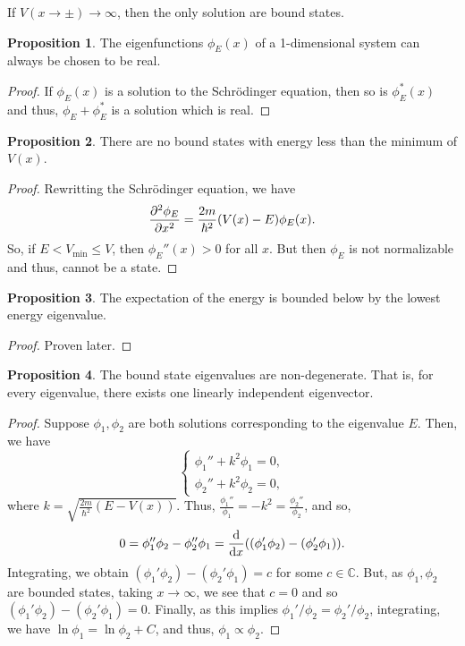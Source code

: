 \documentclass[]{article}
\theoremstyle{definition}
\theoremstyle{definition}
\newtheorem{proposition}{Proposition}[section]
\begin{document}
If \(V(x \to \pm) \to \infty\), then the only solution are bound states.

\begin{proposition}
  The eigenfunctions \(\phi_E(x)\) of a 1-dimensional system can always be 
  chosen to be real.
\end{proposition}
\begin{proof}
  If \(\phi_E(x)\) is a solution to the Schrödinger equation, then so is 
  \(\phi_E^*(x)\) and thus, \(\phi_E + \phi_E^*\) is a solution which is 
  real.
\end{proof}

\begin{proposition}
  There are no bound states with energy less than the minimum of \(V(x)\).
\end{proposition}
\begin{proof}
  Rewritting the Schrödinger equation, we have 
  \[\pdv[2]{\phi_E}{x} = \frac{2m}{\hbar^2}(V(x) - E)\phi_E(x).\]
  So, if \(E < V_{\min} \le V\), then \(\phi_E''(x) > 0\) for all \(x\).
  But then \(\phi_E\) is not normalizable and thus, cannot be a state.
\end{proof}

\begin{proposition}
  The expectation of the energy is bounded below by the lowest energy eigenvalue.
\end{proposition}
\begin{proof}
  Proven later.
\end{proof}

\begin{proposition}
  The bound state eigenvalues are non-degenerate. That is, for every eigenvalue, 
  there exists one linearly independent eigenvector.
\end{proposition}
\begin{proof}
  Suppose \(\phi_1, \phi_2\) are both solutions corresponding to the eigenvalue 
  \(E\). Then, we have 
  \[\begin{cases}
    \phi_1'' + k^2 \phi_1 = 0,\\
    \phi_2'' + k^2 \phi_2 = 0,
  \end{cases}\]
  where \(k = \sqrt{\frac{2m}{\hbar^2} (E - V(x))}\). Thus, 
  \(\frac{\phi_1''}{\phi_1} = -k^2 = \frac{\phi_2''}{\phi_2}\), and so, 
  \[0 = \phi_1'' \phi_2 - \phi_2'' \phi_1 = 
  \dv{x}((\phi_1' \phi_2) - (\phi_2' \phi_1)).\]
  Integrating, we obtain \((\phi_1' \phi_2) - (\phi_2' \phi_1) = c\) for 
  some \(c \in \mathbb{C}\). But, as \(\phi_1, \phi_2\) are bounded states, 
  taking \(x \to \infty\), we see that \(c = 0\) and so
  \((\phi_1' \phi_2) - (\phi_2' \phi_1) = 0\). Finally, as this implies 
  \(\phi_1'/\phi_2 = \phi_2'/\phi_2\), integrating, we have 
  \(\ln \phi_1 = \ln \phi_2 + C\), and thus, \(\phi_1 \propto \phi_2\).
\end{proof}
\end{document}

